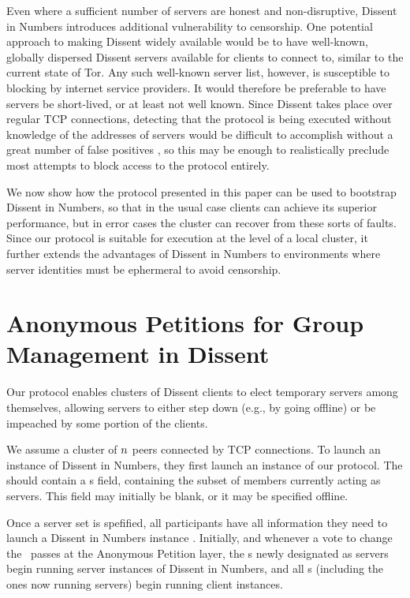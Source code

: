   Even where a sufficient number of servers are honest and non-disruptive,
  Dissent in Numbers introduces additional vulnerability to censorship.
  One potential approach to making Dissent widely available would be to have
  well-known, globally dispersed Dissent servers available for clients to
  connect to, similar to the current state of Tor. Any such well-known server
  list, however, is susceptible to blocking by internet service providers. It
  would therefore be preferable to have servers be short-lived, or at least
  not well known. Since Dissent takes place over regular TCP connections,
  detecting that the protocol is being executed without knowledge of the
  addresses of servers would be difficult to accomplish without a great number
  of false positives \cite{houmansadr_parrot_2013}, so this may be enough to
  realistically preclude most attempts to block access to the protocol
  entirely.

  We now show how the protocol presented in this paper can be used to
  bootstrap Dissent in Numbers, so that in the usual case clients can achieve
  its superior performance, but in error cases the cluster can recover from
  these sorts of faults. Since our protocol is suitable for execution at the
  level of a local cluster, it further extends the advantages of Dissent in
  Numbers to environments where server identities must be ephermeral to avoid
  censorship.

\section{Anonymous Petitions for Group Management in Dissent}
  Our protocol enables clusters of Dissent clients to elect temporary
  servers among themselves, allowing servers to either step down (e.g., by
  going offline) or be impeached by some portion of the clients.

  We assume a cluster of $n$ peers connected by TCP connections. To
  launch an instance of Dissent in Numbers, they first launch an instance of our
  protocol. The \KwManifest should contain a \KwServer s field, containing the
  subset of \KwRoster members currently acting as servers. This field may
  initially be blank, or it may be specified offline.

  Once a server set is spefified, all participants have all information they
  need to launch a Dissent in Numbers instance \cite{din}. Initially, and
  whenever a vote to change the \KwManifest~passes at the Anonymous Petition
  layer, the \KwMember s newly designated as servers begin running server
  instances of Dissent in Numbers, and all \KwMember s (including the ones now
  running servers) begin running client instances.

